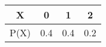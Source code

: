 \begin{center}
\begin{tabular}{|c|c|c|c|} 
    \hline
    X & 0 & 1 & 2 \\
    \hline
    P(X) & 0.4 & 0.4 & 0.2 \\
    \hline
\end{tabular}
\end{center}